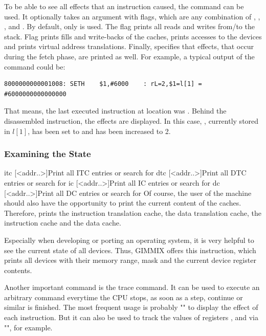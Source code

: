 \noindent To be able to see all effects that an instruction caused, the command  can be used. It optionally takes an argument with flags, which are any combination of , , ,  and . By default, only  is used. The flag  prints all reads and writes from/to the stack. Flag  prints fills and write-backs of the caches,  prints accesses to the devices and  prints virtual address translations. Finally,  specifies that effects, that occur during the fetch phase, are printed as well. For example, a typical output of the command could be:
\begin{verbatim}
8000000000001008: SETH    $1,#6000    : rL=2,$1=l[1] = #6000000000000000
\end{verbatim}
That means, the last executed instruction at location  was . Behind the disassembled instruction, the effects are displayed. In this case, , currently stored in $l[1]$, has been set to  and  has been increased to 2.

\subsubsection{Examining the State}

\gcmdtblfour
	{itc [<addr..>]}{Print all ITC entries or search for }
	{dtc [<addr..>]}{Print all DTC entries or search for }
	{ic [<addr..>]}{Print all IC entries or search for }
	{dc [<addr..>]}{Print all DC entries or search for }
\noindent Of course, the user of the machine should also have the opportunity to print the current content of the caches. Therefore,  prints the instruction translation cache,  the data translation cache,  the instruction cache and  the data cache.

\noindent Especially when developing or porting an operating system, it is very helpful to see the current state of all devices. Thus, GIMMIX offers this instruction, which prints all devices with their memory range,  mask and the current device register contents.

\noindent Another important command is the trace command. It can be used to execute an arbitrary command everytime the CPU stops, \ie as soon as a step, continue or similar is finished. The most frequent usage is probably "" to display the effect of each instruction. But it can also be used to track the values of registers ,  and  via "", for example.


